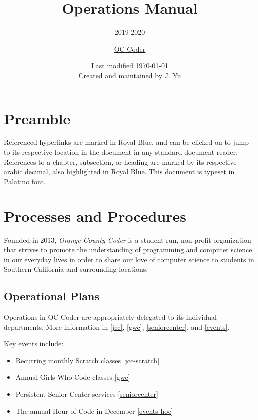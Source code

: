 \documentclass[twoside,11pt,letterpaper,abstracton]{scrartcl}
\title{Operations Manual}
\subtitle{2019-2020}
\author{\normalsize{\href{https://occoder.org}{OC Coder}}}
\date{\normalsize{Last modified \today \\ \small{Created and maintained by J. Yu}}}
\begin{document}
\thispagestyle{empty}

\maketitle

\section*{Preamble}

Referenced hyperlinks are marked in \color{RoyalBlue} Royal Blue\color{Black}, and can be clicked on to jump to its respective location in the document in any standard document reader. References to a chapter, subsection, or heading are marked by its respective arabic decimal, also highlighted in \color{RoyalBlue} Royal Blue\color{Black}. This document is typeset in Palatino font.

\tableofcontents

\newpage

\section{Processes and Procedures}

Founded in 2013, \emph{Orange County Coder} is a student-run, non-profit organization that strives to promote the understanding of programming and computer science in our everyday lives in order to share our love of computer science to students in Southern California and  surrounding locations.

\subsection{Operational Plans}

Operations in OC Coder are appropriately delegated to its individual departments. More information in \cref{jcc}, \cref{gwc}, \cref{seniorcenter}, and \cref{events}.

Key events include:
\begin{itemize}
    \item Recurring monthly Scratch classes     \cref{jcc-scratch}
    \item Annual Girls Who Code classes         \cref{gwc}
    \item Persistent Senior Center services     \cref{seniorcenter}
    \item The annual Hour of Code in December   \cref{events-hoc}
\end{itemize}
\end{document}

